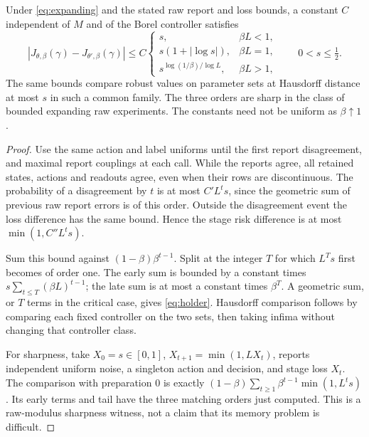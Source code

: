 \begin{theorem}\label{thm:holder}
Under \eqref{eq:expanding} and the stated raw report and loss bounds, a constant $C$ independent of $M$ and of the Borel controller satisfies
\begin{equation}\label{eq:holder}
 |J_{\theta,\beta}(\gamma)-J_{\theta',\beta}(\gamma)|
 \le C\begin{cases}
 s,&\beta L<1,\\
 s(1+|\log s|),&\beta L=1,\\
 s^{\log(1/\beta)/\log L},&\beta L>1,
 \end{cases}\qquad 0<s\le\tfrac12.
\end{equation}
The same bounds compare robust values on parameter sets at Hausdorff distance at most $s$ in such a common family. The three orders are sharp in the class of bounded expanding raw experiments. The constants need not be uniform as $\beta\uparrow1$.
\end{theorem}
\begin{proof}
Use the same action and label uniforms until the first report disagreement, and maximal report couplings at each call. While the reports agree, all retained states, actions and readouts agree, even when their rows are discontinuous. The probability of a disagreement by $t$ is at most $C' L^t s$, since the geometric sum of previous raw report errors is of this order. Outside the disagreement event the loss difference has the same bound. Hence the stage risk difference is at most $\min(1,C''L^t s)$.

Sum this bound against $(1-\beta)\beta^{t-1}$. Split at the integer $T$ for which $L^T s$ first becomes of order one. The early sum is bounded by a constant times $s\sum_{t\le T}(\beta L)^{t-1}$; the late sum is at most a constant times $\beta^T$. A geometric sum, or $T$ terms in the critical case, gives \eqref{eq:holder}. Hausdorff comparison follows by comparing each fixed controller on the two sets, then taking infima without changing that controller class.

For sharpness, take $X_0=s\in[0,1]$, $X_{t+1}=\min(1,LX_t)$, reports independent uniform noise, a singleton action and decision, and stage loss $X_t$. The comparison with preparation $0$ is exactly
$(1-\beta)\sum_{t\ge1}\beta^{t-1}\min(1,L^t s)$.
Its early terms and tail have the three matching orders just computed. This is a raw-modulus sharpness witness, not a claim that its memory problem is difficult.
\end{proof}

